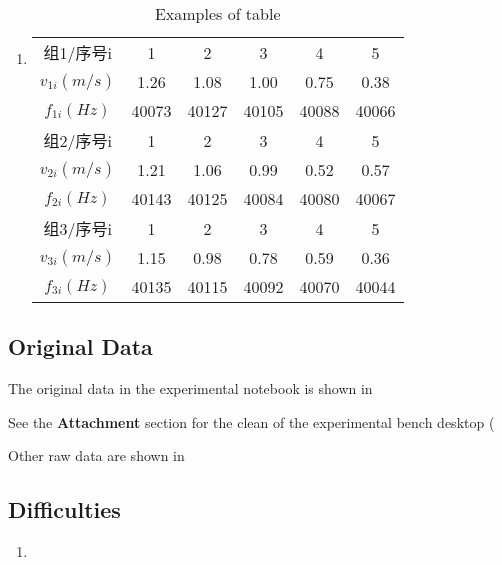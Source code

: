 \begin{enumerate}
	\item \begin{table}[h]
		\centering
		\caption{Examples of table}
		\label{tab:tab1}
		\begin{tabular}{|c|c|c|c|c|c|}
			\hline
			组1/序号i & 1 & 2 & 3 & 4 & 5 \\
			$v_{1i}(m/s)$ & 1.26 & 1.08 & 1.00 & 0.75 & 0.38 \\
			$f_{1i}(Hz)$ & 40073 & 40127 & 40105 & 40088 & 40066 \\
			\hline
			组2/序号i & 1 & 2 & 3 & 4 & 5 \\
			$v_{2i}(m/s)$ & 1.21 & 1.06 & 0.99 & 0.52 & 0.57 \\
			$f_{2i}(Hz)$ & 40143 & 40125 & 40084 & 40080 & 40067 \\
			\hline
			组3/序号i & 1 & 2 & 3 & 4 & 5 \\
			$v_{3i}(m/s)$ & 1.15 & 0.98 & 0.78 & 0.59 & 0.36 \\
			$f_{3i}(Hz)$ & 40135 & 40115 & 40092 & 40070 & 40044 \\
			\hline
		\end{tabular}
	\end{table}		
\end{enumerate}


\subsection{Original Data}
The original data in the experimental notebook is shown in %

See the \textbf{Attachment} section for the clean of the experimental bench desktop (%

Other raw data are shown in %


\subsection{Difficulties}
\begin{enumerate}
	\item 
\end{enumerate}
